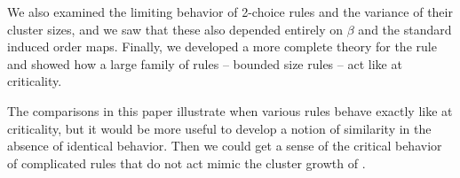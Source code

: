 \documentclass[twoside,10pt]{article}
\begin{document}
We also examined the limiting behavior of 2-choice rules and the variance of their cluster sizes, and we saw that these also depended entirely on $\beta$ and the standard induced order maps. Finally, we developed a more complete theory for the \ER rule and showed how a large family of rules -- bounded size rules -- act like \ER at criticality.

The \ER comparisons in this paper illustrate when various rules behave exactly like \ER at criticality, but it would be more useful to develop a notion of similarity in the absence of identical behavior. Then we could get a sense of the critical behavior of complicated rules that do not act mimic the cluster growth of \ER.


\printbibliography
\end{document}
